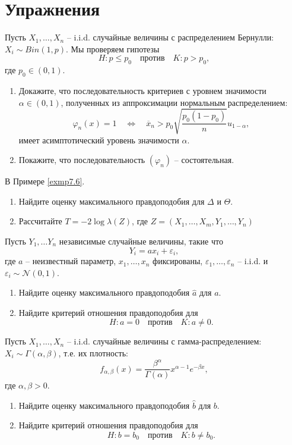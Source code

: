 \section*{Упражнения}
\begin{exc}
	Пусть $X_1, \dots, X_n$ -- i.i.d. случайные величины с распределением Бернулли: $X_i \sim Bin(1, p)$. Мы проверяем гипотезы
	\[ H: p \leq p_0 \quad \text{против} \quad K: p > p_0, \]
	где $p_0 \in (0, 1)$.
	\begin{enumerate}
		\item Докажите, что последовательность критериев с уровнем значимости $\alpha \in (0, 1)$, полученных из аппроксимации нормальным распределением:
		\[ \varphi_n(x) = 1 \quad \Leftrightarrow \quad \overline{x}_n > p_0 \sqrt{\frac{p_0(1-p_0)}{n}} u_{1-\alpha}, \]
		имеет асимптотический уровень значимости $\alpha$.
		\item Покажите, что последовательность $(\varphi_n)$ -- состоятельная.
	\end{enumerate}
\end{exc}

\begin{exc}
	В Примере \ref{exmp7.6}.
	\begin{enumerate}
		\item Найдите оценку максимального правдоподобия для $\Delta$ и $\Theta$.
		\item Рассчитайте $T = -2\log \lambda(Z)$, где $Z = (X_1,\dots, X_m, Y_1, \dots, Y_n)$
	\end{enumerate}
\end{exc}

\begin{exc}
	Пусть $Y_1, \dots Y_n$ независимые случайные величины, такие что
	\[ Y_i = a x_i + \varepsilon_i, \]
	где $a$ -- неизвестный параметр, $x_1, \dots, x_n$ фиксированы, $\varepsilon_1, \dots, \varepsilon_n$ -- i.i.d. и $\varepsilon_i \sim \mathcal{N}(0, 1)$. 
	\begin{enumerate}
		\item Найдите оценку максимального правдоподобия $\hat{a}$ для $a$.
		\item Найдите критерий отношения правдоподобия для 
		\[ H:a = 0 \quad \text{против} \quad K: a \neq 0. \]
	\end{enumerate}
\end{exc}

\begin{exc}
	Пусть $X_1, \dots, X_n$ -- i.i.d. случайные величины с гамма-распределением: $X_i \sim \Gamma(\alpha, \beta)$, т.е. их плотность:
	\[ f_{\alpha, \beta}(x) = \frac{\beta^\alpha}{\Gamma(\alpha)} x^{\alpha - 1} e^{-\beta x}, \]
	где $\alpha, \beta > 0$.
	\begin{enumerate}
		\item Найдите оценку максимального правдоподобия $\hat{b}$ для $b$.
		\item Найдите критерий отношения правдоподобия для 
		\[ H:b = b_0 \quad \text{против} \quad K: b \neq b_0. \]
	\end{enumerate}
\end{exc}

